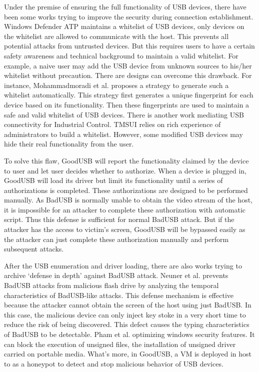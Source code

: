 Under the premise of ensuring the full functionality of USB devices, there have been some works trying to improve the security during connection establishment.
Windows Defender ATP\cite{windenfenderwhite} maintains a whitelist of USB devices, only devices on the whitelist are allowed to communicate with the host. This prevents all potential attacks from untrusted devices. But this requires users to have a certain safety awareness and technical background to maintain a valid whitelist. For example, a naive user may add the USB device from unknown sources to his/her whitelist without precaution. There are designs can overcome this drawback. For instance, Mohammadmoradi et al.\cite{mohammadmoradi2018making} proposes a strategy to generate such a whitelist automatically. This strategy first generates a unique fingerprint for each device based on its functionality. Then these fingerprints are used to maintain a safe and valid whitelist of USB devices. There is another work mediating USB connectivity for Industrial Control. TMSUI\cite{yang2015tmsui} relies on rich experience of administrators to build a whitelist. However, some modified USB devices may hide their real functionality from the user.

To solve this flaw, GoodUSB\cite{tian2015defending} will report the functionality claimed by the device to user and let user decides whether to authorize. When a device is plugged in, GoodUSB will load its driver but limit its functionality until a series of authorizations is completed. These authorizations are designed to be performed manually. As BadUSB is normally unable to obtain the video stream of the host, it is impossible for an attacker to complete these authorization with automatic script. Thus this defense is sufficient for normal BadUSB attack. But if the attacker has the access to victim's screen, GoodUSB will be bypassed easily as the attacker can just complete these authorization manually and perform subsequent attacks.

After the USB enumeration and driver loading, there are also works trying to archive `defense in depth' against BadUSB attack.
Neuner et al.\cite{neuner2018usblock} prevents BadUSB attacks from malicious flash drive by analyzing the temporal characteristics of BadUSB-like attacks. This defense mechanism is effective because the attacker cannot obtain the screen of the host using just BadUSB. In this case, the malicious device can only inject key stoke in a very short time to reduce the risk of being discovered. This defect causes the typing characteristics of BadUSB to be detectable.  Pham et al. \cite{pham2010optimizing} optimizing windows security features. It can block the execution of unsigned files, the installation of unsigned driver carried on portable media. What's more, in GoodUSB, a VM is deployed in host to as a honeypot to detect and stop malicious behavior of USB devices.


